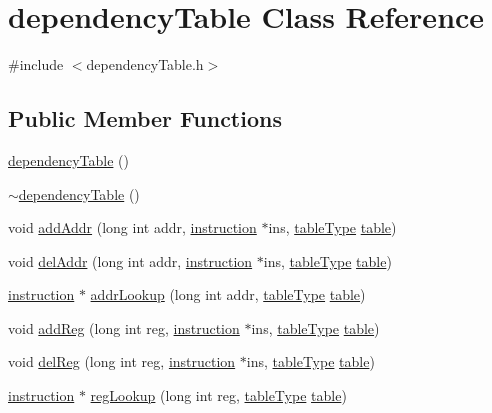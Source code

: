 \hypertarget{classdependencyTable}{
\section{dependencyTable Class Reference}
\label{classdependencyTable}
}


{\ttfamily \#include $<$dependencyTable.h$>$}

\subsection*{Public Member Functions}
\begin{DoxyCompactItemize}
\item 
\hyperlink{classdependencyTable_abae7a5ee69f34dfca3d0b1195b773225}{dependencyTable} ()
\item 
\hyperlink{classdependencyTable_a0b227c520264190bae8782e4f9db593a}{$\sim$dependencyTable} ()
\item 
void \hyperlink{classdependencyTable_a2152aa2490daef06772595e126e6e024}{addAddr} (long int addr, \hyperlink{classinstruction}{instruction} $\ast$ins, \hyperlink{backend_2dependencyTable_8h_ab390e08ed69004340ece1f911f48fd1b}{tableType} \hyperlink{classtable}{table})
\item 
void \hyperlink{classdependencyTable_abffec553d72068c891beb9fa8fe73440}{delAddr} (long int addr, \hyperlink{classinstruction}{instruction} $\ast$ins, \hyperlink{backend_2dependencyTable_8h_ab390e08ed69004340ece1f911f48fd1b}{tableType} \hyperlink{classtable}{table})
\item 
\hyperlink{classinstruction}{instruction} $\ast$ \hyperlink{classdependencyTable_ad5215d3493ae1b82e37e673b33fd6892}{addrLookup} (long int addr, \hyperlink{backend_2dependencyTable_8h_ab390e08ed69004340ece1f911f48fd1b}{tableType} \hyperlink{classtable}{table})
\item 
void \hyperlink{classdependencyTable_a8ef091ae6d3ca417958673d50fd9a8a6}{addReg} (long int reg, \hyperlink{classinstruction}{instruction} $\ast$ins, \hyperlink{backend_2dependencyTable_8h_ab390e08ed69004340ece1f911f48fd1b}{tableType} \hyperlink{classtable}{table})
\item 
void \hyperlink{classdependencyTable_a6057fc845371e5846048e7c7ede21cd8}{delReg} (long int reg, \hyperlink{classinstruction}{instruction} $\ast$ins, \hyperlink{backend_2dependencyTable_8h_ab390e08ed69004340ece1f911f48fd1b}{tableType} \hyperlink{classtable}{table})
\item 
\hyperlink{classinstruction}{instruction} $\ast$ \hyperlink{classdependencyTable_a38380b935c33267006d7242d1b72e62a}{regLookup} (long int reg, \hyperlink{backend_2dependencyTable_8h_ab390e08ed69004340ece1f911f48fd1b}{tableType} \hyperlink{classtable}{table})

\end{DoxyCompactItemize}

